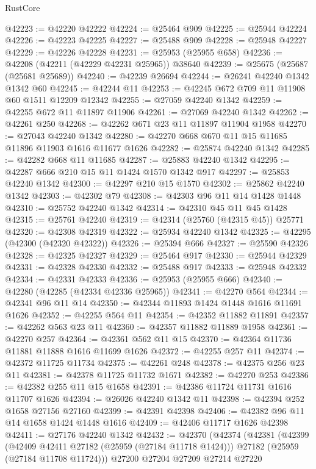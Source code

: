 \begin{lexlean}{RustCore}
\begin{coremodule}
@42223 := @42220 @42222
@42224 := @25464 @909
@42225 := @25944 @42224
@42226 := @42223 @42225
@42227 := @25488 @909
@42228 := @25948 @42227
@42229 := @42226 @42228
@42231 := @25953 (@25955 @658)
@42236 := @42208 (@42211 (@42229 @42231 @25965)) @38640
@42239 := @25675 (@25687 (@25681 @25689))
@42240 := @42239 @26694
@42244 := @26241 @42240 @1342 @1342 @60
@42245 := @42244 @11
@42253 := @42245 @672 @709 @11 @11908 @60 @1511 @12209 @12342
@42255 := @27059 @42240 @1342
@42259 := @42255 @672 @11 @11897 @11906
@42261 := @27069 @42240 @1342
@42262 := @42261 @250
@42268 := @42262 @671 @23 @11 @11897 @11904 @1958
@42270 := @27043 @42240 @1342
@42280 := @42270 @668 @670 @11 @15 @11685 @11896 @11903 @1616 @11677 @1626
@42282 := @25874 @42240 @1342
@42285 := @42282 @668 @11 @11685
@42287 := @25883 @42240 @1342
@42295 := @42287 @666 @210 @15 @11 @1424 @1570 @1342 @917
@42297 := @25853 @42240 @1342
@42300 := @42297 @210 @15 @1570
@42302 := @25862 @42240 @1342
@42303 := @42302 @79
@42308 := @42303 @96 @11 @14 @1428 @1448
@42310 := @25752 @42240 @1342
@42314 := @42310 @45 @11 @45 @1428
@42315 := @25761 @42240
@42319 := @42314 (@25760 (@42315 @45)) @25771
@42320 := @42308 @42319
@42322 := @25934 @42240 @1342
@42325 := @42295 (@42300 (@42320 @42322))
@42326 := @25394 @666
@42327 := @25590 @42326
@42328 := @42325 @42327
@42329 := @25464 @917
@42330 := @25944 @42329
@42331 := @42328 @42330
@42332 := @25488 @917
@42333 := @25948 @42332
@42334 := @42331 @42333
@42336 := @25953 (@25955 @666)
@42340 := @42280 (@42285 (@42334 @42336 @25965))
@42341 := @42270 @564
@42344 := @42341 @96 @11 @14
@42350 := @42344 @11893 @1424 @1448 @1616 @11691 @1626
@42352 := @42255 @564 @11
@42354 := @42352 @11882 @11891
@42357 := @42262 @563 @23 @11
@42360 := @42357 @11882 @11889 @1958
@42361 := @42270 @257
@42364 := @42361 @562 @11 @15
@42370 := @42364 @11736 @11881 @11888 @1616 @11699 @1626
@42372 := @42255 @257 @11
@42374 := @42372 @11725 @11734
@42375 := @42261 @248
@42378 := @42375 @256 @23 @11
@42381 := @42378 @11725 @11732 @1671
@42382 := @42270 @253
@42386 := @42382 @255 @11 @15 @1658
@42391 := @42386 @11724 @11731 @1616 @11707 @1626
@42394 := @26026 @42240 @1342 @11
@42398 := @42394 @252 @1658 @27156 @27160
@42399 := @42391 @42398
@42406 := @42382 @96 @11 @14 @1658 @1424 @1448 @1616
@42409 := @42406 @11717 @1626 @42398
@42411 := @27176 @42240 @1342
@42432 := @42370
    (@42374
      (@42381
        (@42399
          (@42409 @42411 @27182 (@25959 (@27184 @11718 @1424)))
          @27182
          (@25959 (@27184 @11708 @11724)))
        @27200
        @27204
        @27209
        @27214
        @27220

\end{coremodule}
\end{lexlean}
